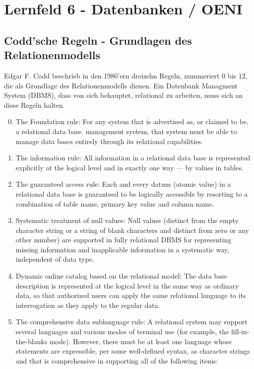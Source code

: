 \section{Lernfeld 6 - Datenbanken / OENI} %

\subsection{Codd'sche Regeln - Grundlagen des Relationenmodells}

Edgar F. Codd beschrieb in den 1980'ern dreizehn Regeln, nummeriert $0$ bis $12$, die als Grundlage des Relationenmodells dienen. Ein Datenbank Managment System (DBMS), dass von sich behauptet, relational zu arbeiten, muss sich an diese Regeln halten.

\begin{enumerate}%
	\setcounter{enumi}{-1}
	\item The Foundation rule: For any system that is advertised as, or claimed to be, a relational data base.
	management system, that system must be able to manage data bases entirely through its relational capabilities.
	\item The information rule: All information in a relational data base is represented explicitly at the logical level and in exactly one way — by values in tables.
	\item The guaranteed access rule: Each and every datum (atomic value) in a relational data base is guaranteed to be logically accessible by resorting to a combination of table name, primary key value and column name.
	\item Systematic treatment of null values: Null values (distinct from the empty character string or a string of blank characters and distinct from zero or any other number) are supported in fully relational DBMS for representing missing information and inapplicable information in a systematic way, independent of data type.
	\item Dynamic online catalog based on the relational model: The data base description is represented at the logical level in the same way as ordinary data, so that authorized users can apply the same relational language to its interrogation as they apply to the regular data.
	\item The comprehensive data sublanguage rule: A relational system may support several languages and various modes of terminal use (for example, the fill-in-the-blanks mode). However, there must be at least one language whose statements are expressible, per some well-defined syntax, as character strings and that is comprehensive in supporting all of the following items:

\end{enumerate}
